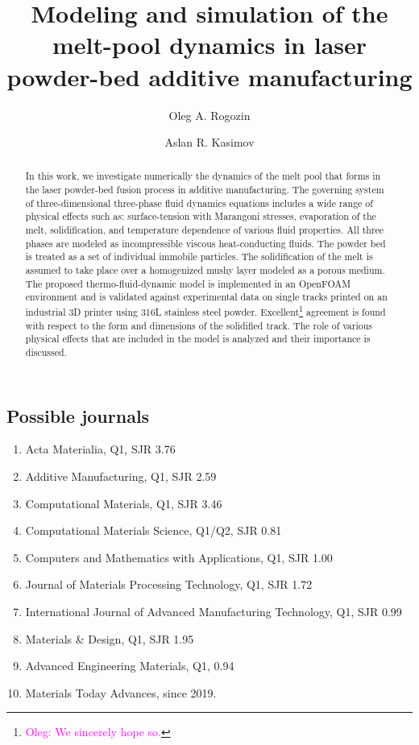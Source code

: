 \documentclass{article}
\title{Modeling and simulation of the melt-pool dynamics in laser powder-bed additive manufacturing}
\author{Oleg A. Rogozin}
\author{Aslan R. Kasimov}
\affil{Center for Design, Manufacturing and Materials \\
    Skolkovo Institute of Science and Technology, Moscow, Russia}
\date{}
\newcommand{\OpenFOAM}{OpenFOAM\textregistered\xspace}
\newcommand{\oleg}[1]{\textcolor{magenta}{\footnote{\textcolor{magenta}{Oleg: #1}}}} %
\begin{document}
\maketitle

\begin{abstract}
In this work, we investigate numerically the dynamics of the melt pool that forms in the laser powder-bed fusion process in additive manufacturing. The governing system of three-dimensional three-phase fluid dynamics equations  includes a wide range of physical effects such as: surface-tension with Marangoni stresses, evaporation of the melt, solidification, and temperature dependence of various fluid properties.
%
All three phases are modeled as incompressible viscous heat-conducting fluids. The powder bed is treated as a set of individual immobile particles. The solidification of the melt is assumed to take place over a homogenized mushy layer modeled as a porous medium.
%
The proposed thermo-fluid-dynamic model is implemented in an \OpenFOAM environment and is validated against experimental data on single tracks printed on an industrial 3D printer using 316L stainless steel powder.
Excellent\oleg{We sincerely hope so.} agreement is found with respect to the form and dimensions of the solidified track. The role of various physical effects that are included in the model is analyzed and their importance is discussed.
\end{abstract}

\tableofcontents

\subsection{Possible journals}
\begin{enumerate}
    \item Acta Materialia, Q1, SJR 3.76
    \item Additive Manufacturing, Q1, SJR 2.59
    \item Computational Materials, Q1, SJR 3.46
    \item Computational Materials Science, Q1/Q2, SJR 0.81
    \item Computers and Mathematics with Applications, Q1, SJR 1.00
    \item Journal of Materials Processing Technology, Q1, SJR 1.72
    \item International Journal of Advanced Manufacturing Technology, Q1, SJR 0.99
    \item Materials \& Design, Q1, SJR 1.95
    \item Advanced Engineering Materials, Q1, 0.94
    \item Materials Today Advances, since 2019.
\end{enumerate}
\end{document}
